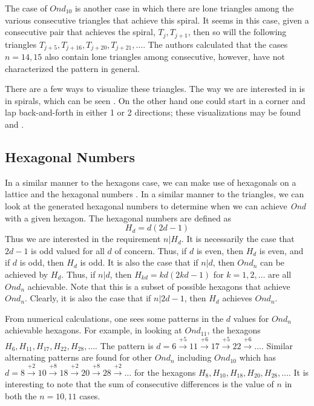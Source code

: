 \documentclass[11pt,reqno]{amsart}
\theoremstyle{mydef}
\begin{document}
The case of $Ond_{10}$ is another case in which there are lone triangles among the various consecutive triangles
that achieve this spiral. It seems in this case, given a consecutive pair that achieves the spiral, $T_{j}, T_{j+1}$, then
so will the following triangles $T_{j+5}, T_{j+16}, T_{j+20}, T_{j+21}, \ldots$. The authors  calculated that the cases
$n = 14, 15$ also contain lone triangles among consecutive, however, have not characterized the pattern in general.

There are a few ways to visualize these triangles. The way we are interested in is in spirals, which can be seen \cite{trivisspiral}. 
On the other hand one could start in a corner and  lap back-and-forth in either 1 or 2 directions; these visualizations may 
be found \cite{trivis1} and \cite{trivis2}.



\subsection{Hexagonal Numbers}

In a similar manner to the hexagons case, we can make use of hexagonals on a lattice and 
the hexagonal numbers  \cite{HexagonalNumbers}. In a similar manner to the triangles, we can look at the
generated hexagonal numbers to determine when we can achieve \emph{Ond} with a given hexagon. The hexagonal numbers are
defined as 
\[
	H_d = d(2d - 1)
\]
Thus we are interested in the requirement $n \vert H_d$. It is necessarily the case that $2d - 1$ is 
odd valued for all $d$ of concern. Thus, if $d$ is even, then $H_d$ is even, and if $d$ is odd, then
$H_d$ is odd. It is also the case that if $n \vert d$, then $Ond_n$ can be achieved by $H_d$. Thus,
if $n \vert d$, then $H_{kd} = kd(2kd - 1)$ for $k = 1, 2, \ldots$ are all $Ond_n$ achievable. Note that 
this is a subset of possible hexagons that achieve $Ond_n$. Clearly, it is also the case that if $n \vert
2d - 1$, then $H_d$ achieves $Ond_n$. 

From numerical calculations, one sees some patterns in the $d$ values for $Ond_n$ achievable
hexagons. For example, in looking at $Ond_{11}$, the hexagons $H_{6}, H_{11}, H_{17}, H_{22}, H_{28}, \ldots$.
The pattern is $d = 6 \xrightarrow{+5} 11 \xrightarrow{+6} 17 \xrightarrow{+5} 22 \xrightarrow{+6} \ldots$.
Similar alternating patterns are found for other $Ond_n$ including $Ond_{10}$ which has 
$d = 8 \xrightarrow{+2} 10 \xrightarrow{+8} 18 \xrightarrow{+2} 20 \xrightarrow{+8}  28 \xrightarrow{+2} \ldots$ for the hexagons
$H_{8}, H_{10}, H_{18}, H_{20}, H_{28}, \ldots$. It is interesting to note that the sum of consecutive differences
is the value of $n$ in both the $n = 10, 11$ cases.
\end{document}
